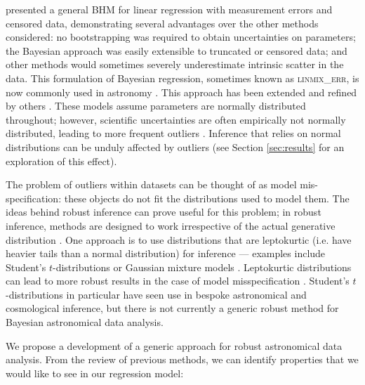 \documentclass[fleqn,usenatbib]{rasti}
\begin{document}
\citet{Kelly:2007} presented a general BHM for linear regression with
measurement errors and censored data, demonstrating  several advantages over the
other methods considered: no bootstrapping was required to obtain uncertainties
on parameters; the Bayesian approach was easily extensible to truncated or
censored data; and other methods would sometimes severely underestimate
intrinsic scatter in the data. This formulation of Bayesian regression,
sometimes known as \textsc{linmix\_err}, is now commonly used in astronomy
\citep[e.g.][]{McConnell:2013, Bentz:2013, Andrews:2013}. This approach has been
extended and refined by others \citep[e.g.][]{Mantz:2016, Sereno:2016,
Bartlett:2023, Jing:2024}. These
models assume parameters are normally distributed throughout; however,
scientific uncertainties are often empirically not normally distributed, leading
to more frequent outliers \citep{Bailey:2017}. Inference that relies on normal
distributions can be unduly affected by outliers (see Section \ref{sec:results}
for an exploration of this effect).

The problem of outliers within datasets can be thought of as model
mis-specification: these objects do not fit the distributions used to model
them. The ideas behind robust inference can prove useful for this problem; in
robust inference, methods are designed to work irrespective of the actual
generative distribution \citep{Berger:1994}. One approach is to use
distributions that are leptokurtic (i.e. have heavier tails than a normal
distribution) for inference --- examples include Student's $t$-distributions
\citep{Andrews:1974} or Gaussian mixture models \citep{Box:1968, Aitkin:1980}.
Leptokurtic distributions can lead to more robust results in the case of model
misspecification \citep[e.g.][]{Berger:1994, Sivia:2006, Gelman:2013}. Student's
$t$-distributions in particular have seen use in bespoke astronomical
\citep[e.g.][]{Andreon:2008, Jontof-Hutter:2016, Park:2017, Andreon:2020} and
cosmological \citep[e.g.][]{Feeney:2018} inference, but there is not currently a
generic robust method for Bayesian astronomical data analysis.

We propose a development of a generic approach for robust astronomical data
analysis. From the review of previous methods, we can identify properties that
we would like to see in our regression model:
\end{document}
